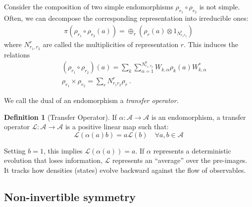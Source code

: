 \documentclass{article}
\newcommand{\nn}{\nonumber}
\theoremstyle{definition}
\newtheorem{definition}{Definition}[section]
\begin{document}
  Consider the composition of two simple endomorphisms $\rho_{r_1}\circ \rho_{r_2}$
  is not simple. Often, we can decompose the corresponding representation into irreducible
  ones:
  \begin{eqnarray}
    \pi(\rho_{r_1}\circ\rho_{r_2}(a))= \oplus_r (\rho_r(a)\otimes 1_{N^r_{r_1r_2}})
  \end{eqnarray}
  where $N^{r}_{r_1,r_2}$ are called the multiplicities of representation $r$. This
  induces the relations
  \begin{eqnarray}
    &&(\rho_{r_1}\circ \rho_{r_2})(a)=\sum_k \sum_{\alpha=1}^{N^k_{r_1,r_2}}W_{k,\alpha}
    \rho_k(a)W_{k,\alpha}^*\nn\\
    &&\rho_{r_1}\times \rho_{r_2}=\sum_r N^r_{r_1r_2} \rho_r\ .
  \end{eqnarray}

  We call the dual of an endomorphism a {\it transfer operator}.
  \begin{definition}[Transfer Operator]
    If $\alpha: \mathcal{A}\to \mathcal{A}$ is an endomorphism, a transfer
    operator $\mathcal{L}: \mathcal{A}\to \mathcal{A}$ is a positive linear map
    such that:
    \begin{equation}
      \mathcal{L}(\alpha(a)b) = a \mathcal{L}(b) \quad \forall a,b \in \mathcal{A}
    \end{equation}
  \end{definition}
  Setting $b=1$, this implies $\mathcal{L}(\alpha(a)) = a$. If $\alpha$ represents
  a deterministic evolution that loses information, $\mathcal{L}$ represents an
  ``average'' over the pre-images. It tracks how densities (states) evolve backward
  against the flow of observables.

  \subsection*{Non-invertible symmetry}
\end{document}
